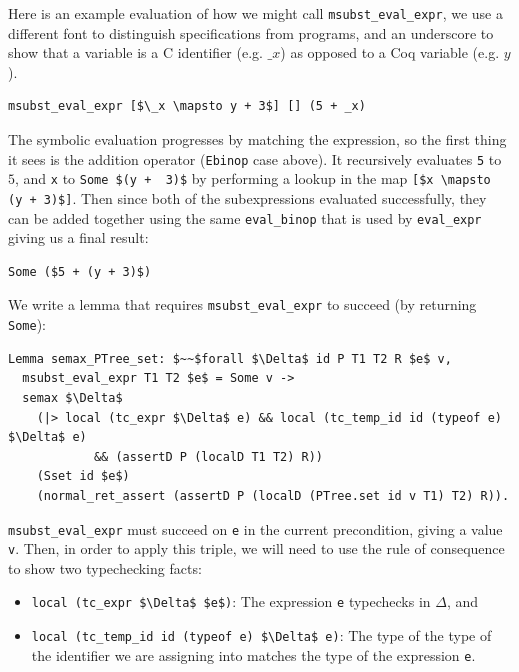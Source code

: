 \documentclass{puthesis}
\begin{document}
Here is an example evaluation of how we might call
\lstinline|msubst_eval_expr|, we use a different font to distinguish
specifications from programs, and an underscore to show that a
variable is a C identifier (e.g. $\_x$) as opposed to a Coq
variable (e.g. $y$).

\begin{lstlisting}
msubst_eval_expr [$\_x \mapsto y + 3$] [] (5 + _x)
\end{lstlisting}

The symbolic evaluation progresses by matching the expression, so the first thing it sees
is the addition operator (\lstinline|Ebinop| case above). It
recursively evaluates \lstinline|5| to $5$,
and \lstinline|x| to \lstinline|Some $(y +  3)$| by performing a lookup in the map
\lstinline|[$x \mapsto (y + 3)$]|. Then since both of the subexpressions
evaluated successfully, they can be added together using the same
\lstinline|eval_binop| that is used by \lstinline|eval_expr| giving us
a final result:

\begin{lstlisting}
Some ($5 + (y + 3)$)
\end{lstlisting}

We write a lemma that requires \lstinline|msubst_eval_expr| to succeed
(by returning \lstinline|Some|):

\begin{lstlisting}
Lemma semax_PTree_set: $~~$forall $\Delta$ id P T1 T2 R $e$ v,
  msubst_eval_expr T1 T2 $e$ = Some v ->
  semax $\Delta$
    (|> local (tc_expr $\Delta$ e) && local (tc_temp_id id (typeof e) $\Delta$ e) 
            && (assertD P (localD T1 T2) R))
    (Sset id $e$)
    (normal_ret_assert (assertD P (localD (PTree.set id v T1) T2) R)).
\end{lstlisting}

\lstinline|msubst_eval_expr| must succeed on \lstinline|e| in the
current precondition, giving a value \lstinline|v|. Then, in order to
apply this triple, we will need to use the rule of consequence to show
two typechecking facts:

\begin{itemize}
\item \lstinline|local (tc_expr $\Delta$ $e$)|: The expression \lstinline|e|
  typechecks in $\Delta$, and
\item \lstinline|local (tc_temp_id id (typeof e) $\Delta$ e)|: The type of
  the type of the identifier we are assigning into matches the type of
  the expression \lstinline|e|.
\end{itemize}
\end{document}
